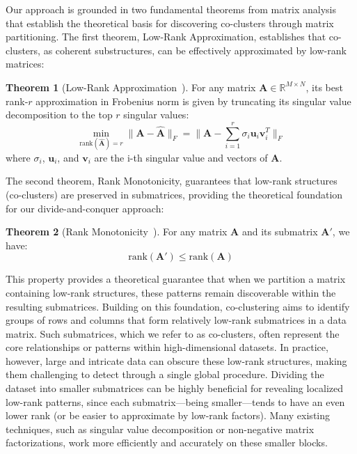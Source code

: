 \documentclass[journal]{IEEEtran}
\theoremstyle{definition}
\newtheorem{theorem}{Theorem}
\theoremstyle{remark} %
\renewcommand{\cite}[1]{~\autocite{#1}}
\begin{document}
Our approach is grounded in two fundamental theorems from matrix analysis that establish the theoretical basis for discovering co-clusters through matrix partitioning. The first theorem, Low-Rank Approximation, establishes that co-clusters, as coherent substructures, can be effectively approximated by low-rank matrices:

\begin{theorem}[Low-Rank Approximation\cite{eckart1936ApproximationOneMatrix}] \label{thm:low-rank-approximation}
    For any matrix $\mathbf{A} \in \mathbb{R}^{M \times N}$, its best rank-$r$ approximation in Frobenius norm is given by truncating its singular value decomposition to the top $r$ singular values:
    \begin{equation}
        \min_{\text{rank}(\hat{\mathbf{A}})=r} \|\mathbf{A} - \hat{\mathbf{A}}\|_F = \|\mathbf{A} - \sum_{i=1}^r \sigma_i \mathbf{u}_i\mathbf{v}_i^T\|_F
    \end{equation}
    where $\sigma_i$, $\mathbf{u}_i$, and $\mathbf{v}_i$ are the i-th singular value and vectors of $\mathbf{A}$.
\end{theorem}

The second theorem, Rank Monotonicity, guarantees that low-rank structures (co-clusters) are preserved in submatrices, providing the theoretical foundation for our divide-and-conquer approach:

\begin{theorem}[Rank Monotonicity\cite{horn1985MatrixAnalysis}] \label{thm:rank-monotonicity}
    For any matrix $\mathbf{A}$ and its submatrix $\mathbf{A}'$, we have:
    \begin{equation}
        \text{rank}(\mathbf{A}') \leq \text{rank}(\mathbf{A})
    \end{equation}
\end{theorem}

This property provides a theoretical guarantee that when we partition a matrix containing low-rank structures, these patterns remain discoverable within the resulting submatrices. Building on this foundation, co-clustering aims to identify groups of rows and columns that form relatively low-rank submatrices in a data matrix. Such submatrices, which we refer to as co-clusters, often represent the core relationships or patterns within high-dimensional datasets. In practice, however, large and intricate data can obscure these low-rank structures, making them challenging to detect through a single global procedure. Dividing the dataset into smaller submatrices can be highly beneficial for revealing localized low-rank patterns, since each submatrix—being smaller—tends to have an even lower rank (or be easier to approximate by low-rank factors). Many existing techniques, such as singular value decomposition or non-negative matrix factorizations, work more efficiently and accurately on these smaller blocks.
\end{document}
